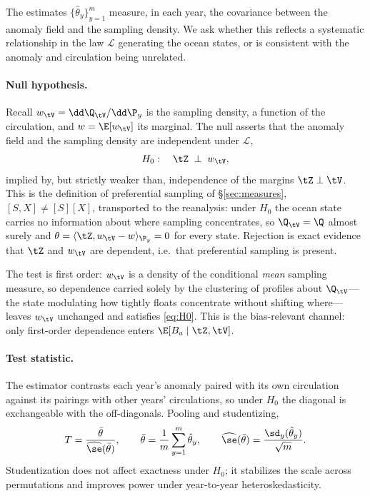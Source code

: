 The estimates $\{\hat\theta_y\}_{y=1}^m$ measure, in each year, the covariance
between the anomaly field and the sampling density. We ask whether this reflects
a systematic relationship in the law $\mathcal L$ generating the ocean states, or
is consistent with the anomaly and circulation being unrelated.

\paragraph{Null hypothesis.}
Recall $w_{\tV} = \dd\Q_{\tV}/\dd\P_y$ is the sampling density, a function of the
circulation, and $w = \E[w_{\tV}]$ its marginal. The null asserts that the
anomaly field and the sampling density are independent under $\mathcal L$,
\begin{equation}
  \label{eq:H0}
  H_0:\quad \tZ \;\perp\; w_{\tV},
\end{equation}
implied by, but strictly weaker than, independence of the margins $\tZ\perp\tV$.
This is the definition of preferential sampling of \S\ref{sec:measures},
$[S,X]\neq[S][X]$, transported to the reanalysis: under $H_0$ the ocean state
carries no information about where sampling concentrates, so $\Q_{\tV} = \Q$
almost surely and $\theta = \langle\tZ, w_{\tV}-w\rangle_{\P_y} = 0$ for every
state. Rejection is exact evidence that $\tZ$ and $w_{\tV}$ are dependent, i.e.\
that preferential sampling is present.

The test is first order: $w_{\tV}$ is a density of the conditional \emph{mean}
sampling measure, so dependence carried solely by the clustering of profiles
about $\Q_{\tV}$---the state modulating how tightly floats concentrate without
shifting where---leaves $w_{\tV}$ unchanged and satisfies \eqref{eq:H0}. This is
the bias-relevant channel: only first-order dependence enters $\E[B_a\mid\tZ,\tV]$.

\paragraph{Test statistic.}
The estimator contrasts each year's anomaly paired with its own circulation
against its pairings with other years' circulations, so under $H_0$ the diagonal
is exchangeable with the off-diagonals. Pooling and studentizing,
\begin{equation}
  \label{eq:teststat}
  T = \frac{\bar\theta}{\widehat\se(\bar\theta)},
  \qquad
  \bar\theta = \frac{1}{m}\sum_{y=1}^m \hat\theta_y,
  \qquad
  \widehat\se(\bar\theta) = \frac{\sd_y(\hat\theta_y)}{\sqrt m}.
\end{equation}
Studentization does not affect exactness under $H_0$; it stabilizes the scale
across permutations and improves power under year-to-year heteroskedasticity.

